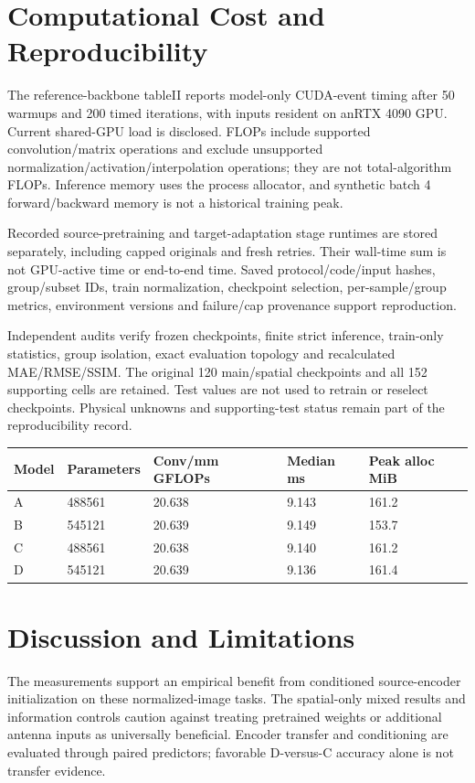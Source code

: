 \documentclass[conference]{IEEEtran}
\begin{document}
\section{Computational Cost and Reproducibility}
The reference-backbone tableII reports model-only CUDA-event timing after 50 warmups and 200 timed iterations, with inputs resident on anRTX 4090 GPU. Current shared-GPU load is disclosed. FLOPs include supported convolution/matrix operations and exclude unsupported normalization/activation/interpolation operations; they are not total-algorithm FLOPs. Inference memory uses the process allocator, and synthetic batch 4 forward/backward memory is not a historical training peak.

Recorded source-pretraining and target-adaptation stage runtimes are stored separately, including capped originals and fresh retries. Their wall-time sum is not GPU-active time or end-to-end time. Saved protocol/code/input hashes, group/subset IDs, train normalization, checkpoint selection, per-sample/group metrics, environment versions and failure/cap provenance support reproduction.

Independent audits verify frozen checkpoints, finite strict inference, train-only statistics, group isolation, exact evaluation topology and recalculated MAE/RMSE/SSIM. The original 120 main/spatial checkpoints and all 152 supporting cells are retained. Test values are not used to retrain or reselect checkpoints. Physical unknowns and supporting-test status remain part of the reproducibility record.

\begin{table}[t]\centering\small
\begin{tabular}{lllll}
\toprule
Model & Parameters & Conv/mm GFLOPs & Median ms & Peak alloc MiB \\
\midrule
A & 488561 & 20.638 & 9.143 & 161.2 \\
B & 545121 & 20.639 & 9.149 & 153.7 \\
C & 488561 & 20.638 & 9.140 & 161.2 \\
D & 545121 & 20.639 & 9.136 & 161.4 \\
\bottomrule\end{tabular}\end{table}
\section{Discussion and Limitations}
The measurements support an empirical benefit from conditioned source-encoder initialization on these normalized-image tasks. The spatial-only mixed results and information controls caution against treating pretrained weights or additional antenna inputs as universally beneficial. Encoder transfer and conditioning are evaluated through paired predictors; favorable D-versus-C accuracy alone is not transfer evidence.
\end{document}
